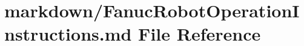 \hypertarget{FanucRobotOperationInstructions_8md}{\section{markdown/\-Fanuc\-Robot\-Operation\-Instructions.md File Reference}
\label{FanucRobotOperationInstructions_8md}
}
